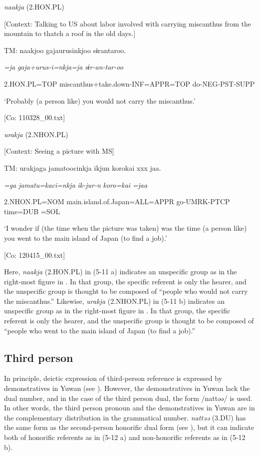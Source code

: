\ea \label{ex:5:11}  \ea \label{ex:5:11a} \textit{naakja} (2.HON.PL)

    [Context: Talking to US about labor involved with carrying miscanthus from the mountain to thatch a roof in the old days.]

    TM:  naakjoo  gajaurusinkjoo  sɨrantaroo.

      \textit{=ja}  \textit{gaja+urus-i=nkja=ja} \textit{sɨr-an-tar-oo}
                                                       
      2.HON.PL=TOP  miscanthus+take.down-INF=APPR=TOP  do-NEG-PST-SUPP

      ‘Probably (a person like) you would not carry the miscanthus.’

      [Co: 110328\_00.txt]

 \ex \label{ex:5:b} \textit{urakja} (2.NHON.PL)

    [Context: Seeing a picture with MS]

    TM:  urakjaga  jamatoocinkja  ikjun  {\textbar}koro{\textbar}kai  xxx  jaa.

      \textit{=ga}  \textit{jamatu=kaci=nkja} \textit{ik-jur-n}  \textit{koro=kai}    \textit{=jaa}
                                                   
      2.NHON.PL=NOM  main.island.of.Japan=ALL=APPR  go-UMRK-PTCP  time=DUB    =SOL

      ‘I wonder if (the time when the picture was taken) was the time (a person like) you went to the main island of Japan (to find a job).’

      [Co: 120415\_00.txt]
      \z
      \z

Here, \textit{naakja} (2.HON.PL) in (5-11 a) indicates an unspecific group as in the right-most figure in . In that group, the specific referent is only the hearer, and the unspecific group is thought to be composed of “people who would not carry the miscanthus.” Likewise, \textit{urakja} (2.NHON.PL) in (5-11 b) indicates an unspecific group as in the right-most figure in . In that group, the specific referent is only the hearer, and the unspecific group is thought to be composed of “people who went to the main island of Japan (to find a job).”

\subsection{Third person}

In principle, deictic expression of third-person reference is expressed by demonstratives in Yuwan (see ). However, the demonstratives in Yuwan lack the dual number, and in the case of the third person dual, the form /nattəə/ is used. In other words, the third person pronoun and the demonstratives in Yuwan are in the complementary distribution in the grammatical number. \textit{nattəə} (3.DU) has the same form as the second-person honorific dual form (see ), but it can indicate both of honorific referents as in (5-12 a) and non-honorific referents as in (5-12 b).

